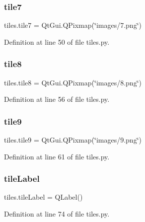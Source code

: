 \subsubsection{\texorpdfstring{tile7}{tile7}}
{\footnotesize\ttfamily tiles.\+tile7 = Qt\+Gui.\+Q\+Pixmap(\char`\"{}images/7.png\char`\"{})}



Definition at line 50 of file tiles.\+py.

\mbox{\label{namespacetiles_ac0cd01c17a9e026060341aa74bc3b4ae}} 
\subsubsection{\texorpdfstring{tile8}{tile8}}
{\footnotesize\ttfamily tiles.\+tile8 = Qt\+Gui.\+Q\+Pixmap(\char`\"{}images/8.png\char`\"{})}



Definition at line 56 of file tiles.\+py.

\mbox{\label{namespacetiles_a069103305595410ecbc23645ec607bc0}} 
\subsubsection{\texorpdfstring{tile9}{tile9}}
{\footnotesize\ttfamily tiles.\+tile9 = Qt\+Gui.\+Q\+Pixmap(\char`\"{}images/9.png\char`\"{})}



Definition at line 61 of file tiles.\+py.

\mbox{\label{namespacetiles_a289fa1b53195b4dbddbd4292ea725d83}} 
\subsubsection{\texorpdfstring{tileLabel}{tileLabel}}
{\footnotesize\ttfamily tiles.\+tile\+Label = Q\+Label()}



Definition at line 74 of file tiles.\+py.

